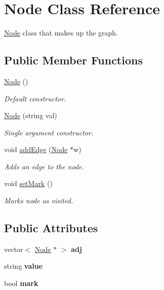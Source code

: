 \hypertarget{classNode}{\section{Node Class Reference}
\label{classNode}
}


\hyperlink{classNode}{Node} class that makes up the graph.  


\subsection*{Public Member Functions}
\begin{DoxyCompactItemize}
\item 
\hyperlink{classNode_ad7a34779cad45d997bfd6d3d8043c75f}{Node} ()
\begin{DoxyCompactList}\small\item\em Default constructor. \end{DoxyCompactList}\item 
\hyperlink{classNode_a8b835b946598512ea4351b0d2c93e71f}{Node} (string val)
\begin{DoxyCompactList}\small\item\em Single argument constructor. \end{DoxyCompactList}\item 
void \hyperlink{classNode_ade4027e428b4eb714f34eeb5386392eb}{add\+Edge} (\hyperlink{classNode}{Node} $\ast$w)
\begin{DoxyCompactList}\small\item\em Adds an edge to the node. \end{DoxyCompactList}\item 
void \hyperlink{classNode_a7788705f2c2aa0e0f15ba3be981a811b}{set\+Mark} ()
\begin{DoxyCompactList}\small\item\em Marks node as visited. \end{DoxyCompactList}\end{DoxyCompactItemize}
\subsection*{Public Attributes}
\begin{DoxyCompactItemize}
\item 
\hypertarget{classNode_af25b1633e05f4d855b79539d1582f86a}{vector$<$ \hyperlink{classNode}{Node} $\ast$ $>$ {\bfseries adj}}\label{classNode_af25b1633e05f4d855b79539d1582f86a}

\item 
\hypertarget{classNode_afbfe6bbcc5e6d53bb23ff4c29c178596}{string {\bfseries value}}\label{classNode_afbfe6bbcc5e6d53bb23ff4c29c178596}

\item 
\hypertarget{classNode_a74306065122add3f9acebc439d5a28f6}{bool {\bfseries mark}}\label{classNode_a74306065122add3f9acebc439d5a28f6}

\end{DoxyCompactItemize}


